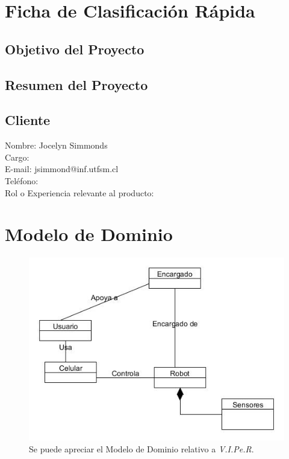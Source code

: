 \documentclass[letterpaper,12pt]{article} %
\numberwithin{equation}{section} %
\numberwithin{figure}{section} %
\numberwithin{table}{section} %
\begin{document}
\setcounter{page}{1} %

\tableofcontents
\newpage

\section{Ficha de Clasificaci\'on R\'apida}
\subsection{Objetivo del Proyecto} %
\subsection{Resumen del Proyecto} %
\subsection{Cliente}
Nombre: Jocelyn Simmonds\\
Cargo: \\
E-mail: jsimmond@inf.utfsm.cl\\
Tel\'efono: \\
Rol o Experiencia relevante al producto:

\newpage
\section{Modelo de Dominio}

\begin{figure}
   \centering
     \includegraphics[scale=0.5]{ModeloDominio.jpg}
   \caption{Se puede apreciar el Modelo de Dominio relativo a \emph{V.I.Pe.R}.}
   \label{fig:ModeloDominio}
\end{figure}
\end{document}
